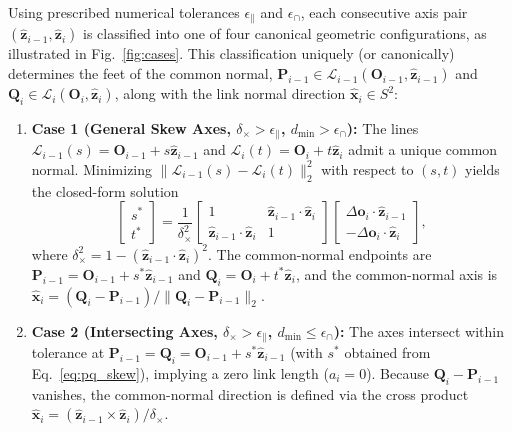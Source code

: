 \documentclass[fleqn,10pt]{article}
\begin{document}
Using prescribed numerical tolerances $\epsilon_\parallel$ and $\epsilon_\cap$, each consecutive axis pair $(\hat{\bm{z}}_{i-1}, \hat{\bm{z}}_i)$ is classified into one of four canonical geometric configurations, as illustrated in Fig.~\ref{fig:cases}. This classification uniquely (or canonically) determines the feet of the common normal, $\bm{P}_{i-1}\in\mathcal{L}_{i-1}(\bm{O}_{i-1},\hat{\bm{z}}_{i-1})$ and $\bm{Q}_i\in\mathcal{L}_i(\bm{O}_i,\hat{\bm{z}}_i)$, along with the link normal direction $\hat{\bm{x}}_i \in S^2$:
\begin{enumerate}
	\item \textbf{Case 1 (General Skew Axes, $\delta_\times>\epsilon_\parallel$, $d_{\min}>\epsilon_\cap$):} The lines $\mathcal{L}_{i-1}(s)=\bm{O}_{i-1}+s\hat{\bm{z}}_{i-1}$ and $\mathcal{L}_i(t)=\bm{O}_i+t\hat{\bm{z}}_i$ admit a unique common normal. Minimizing $\|\mathcal{L}_{i-1}(s)-\mathcal{L}_i(t)\|_2^2$ with respect to $(s,t)$ yields the closed-form solution
	\begin{equation}
		\begin{bmatrix} s^* \\ t^* \end{bmatrix} = \frac{1}{\delta_\times^2} \begin{bmatrix} 1 & \hat{\bm{z}}_{i-1} \cdot \hat{\bm{z}}_i \\ \hat{\bm{z}}_{i-1} \cdot \hat{\bm{z}}_i & 1 \end{bmatrix} \begin{bmatrix} \Delta \bm{o}_i \cdot \hat{\bm{z}}_{i-1} \\ -\Delta \bm{o}_i \cdot \hat{\bm{z}}_i \end{bmatrix},
		\label{eq:pq_skew}
	\end{equation}
	where $\delta_\times^2 = 1 - (\hat{\bm{z}}_{i-1} \cdot \hat{\bm{z}}_i)^2$. The common-normal endpoints are $\bm{P}_{i-1}=\bm{O}_{i-1}+s^*\hat{\bm{z}}_{i-1}$ and $\bm{Q}_i=\bm{O}_i+t^*\hat{\bm{z}}_i$, and the common-normal axis is $\hat{\bm{x}}_i = (\bm{Q}_i - \bm{P}_{i-1}) / \|\bm{Q}_i - \bm{P}_{i-1}\|_2$.
	
	\item \textbf{Case 2 (Intersecting Axes, $\delta_\times>\epsilon_\parallel$, $d_{\min}\le\epsilon_\cap$):} The axes intersect within tolerance at $\bm{P}_{i-1}=\bm{Q}_i=\bm{O}_{i-1}+s^*\hat{\bm{z}}_{i-1}$ (with $s^*$ obtained from Eq.~\eqref{eq:pq_skew}), implying a zero link length ($a_i=0$). Because $\bm{Q}_i - \bm{P}_{i-1}$ vanishes, the common-normal direction is defined via the cross product $\hat{\bm{x}}_i = (\hat{\bm{z}}_{i-1} \times \hat{\bm{z}}_i) / \delta_\times$.
	

\end{enumerate}
\end{document}
